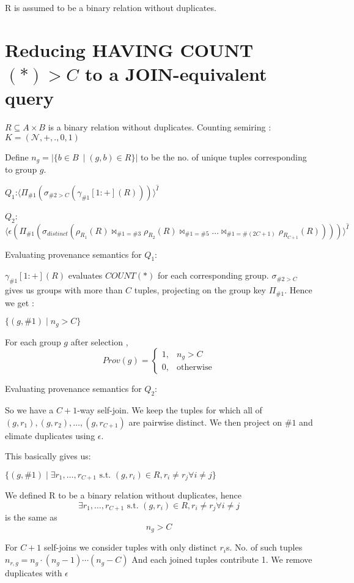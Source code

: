 \documentclass[10pt,a4paper]{scrartcl}
\theoremstyle{definition}
\theoremstyle{remark}
\begin{document}
R is assumed to be a binary relation without duplicates.


\section{Reducing HAVING COUNT$(*) > C$ to a JOIN-equivalent query}

$R \subseteq  A \times B$ is a binary relation without duplicates.
Counting semiring : $K = (\mathcal{N}, +, ., 0, 1)$

Define $n_g = |\{b \in B\ \mid (g,b) \in R\}|$ to be the no. of unique tuples corresponding to group $g$.

$Q_1$:$\langle\Pi_{\#1}(\sigma_{\#2>C}(\gamma_{\#1}[1:+](R)))\rangle^{\hat I}$

$Q_2$: $\langle \epsilon(\Pi_{\#1}(\sigma_{distinct}(\rho_{R_1}(R)\bowtie_{\#1=\#3} \rho_{R_2}(R)\bowtie_{\#1=\#5}\dots\bowtie_{\#1=\#(2C+1)}\rho_{R_{C+1}}(R))))\rangle^{\hat I}$

Evaluating provenance semantics for $Q_1$:

$\gamma_{\#1}[1:+](R)$ evaluates $COUNT(*)$ for each corresponding group. $\sigma_{\#2>C}$ gives us groups with more than $C$ tuples, projecting on the group key $\Pi_{\#1}$.
Hence we get :

$\{ (g,\#1) \mid n_g > C \}$

For each group $g$ after selection ,
$$Prov(g) = \begin{cases}
   1, & n_g > C \\
   0, & \text{otherwise}
   \end{cases}$$

Evaluating provenance semantics for $Q_2$:

So we have a $C+1$-way self-join.
We keep the tuples for which  all of $(g,r_1),(g,r_2),\dots,(g,r_{C+1})$ are pairwise distinct. We then project on $\#1$ and elimate duplicates using $\epsilon$.

This basically gives us:

$\{(g,\#1) \mid \exists r_1,\dots,r_{C+1} \text{  s.t. } (g,r_i) \in R, r_i\neq r_j \forall i \neq j  \}$

We defined R to be a binary relation without duplicates, hence $$\exists r_1,\dots,r_{C+1} \text{  s.t. } (g,r_i) \in R, r_i\neq r_j \forall i \neq j $$ is the same as $$n_g>C$$


For $C+1$ self-joins we consider tuples with only distinct $r_i$s.
No. of such tuples $n_{r, g}= n_g \cdot (n_g-1) \cdots (n_g - C)$
And each joined tuples contribute 1. 
We remove duplicates with $\epsilon$
\end{document}
